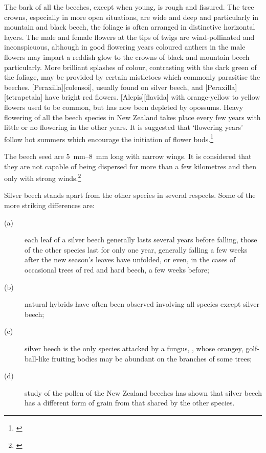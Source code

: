 The bark of all the beeches, except when young, is rough and fissured.
The tree crowns, especially in more open situations, are wide and deep and particularly in mountain and black beech, the foliage is often arranged in distinctive horizontal layers.
The male and female flowers at the tips of twigs are wind-pollinated and inconspicuous, although in good flowering years coloured anthers in the male flowers may impart a reddish glow to the crowns of black and mountain beech particularly.
More brilliant splashes of colour, contrasting with the dark green of the foliage, may be provided by certain mistletoes which commonly parasitise the beeches. [Peraxilla][colensoi], usually found on silver beech, and [Peraxilla][tetrapetala] have bright red flowers. [Alepis][flavida] with orange-yellow to yellow flowers used to be common, but has now been depleted by opossums.
Heavy flowering of all the beech species in New Zealand takes place every few years with little or no flowering in the other years.
It is suggested that `flowering years' follow hot summers which encourage the initiation of flower buds.\footnote{\cite{poole1948flowering}}

The beech seed are \SIrange{5}{8}{\milli\metre} long with narrow wings.
It is considered that they are not capable of being dispersed for more than a few kilometres and then only with strong winds.\footnote{\cite{preest1963dispersal}}

Silver beech stands apart from the other species in several respects.
Some of the more striking differences are:

\begin{description}
\item[{(a)}]each leaf of a silver beech generally lasts several years before falling, those of the other species last for only one year, generally falling a few weeks after the new season's leaves have unfolded, or even, in the cases of occasional trees of red and hard beech, a few weeks before;
\item[{(b)}]natural hybrids have often been observed involving all species except silver beech;
\item[{(c)}]silver beech is the only species attacked by a fungus, , whose orangey, golf-ball-like fruiting bodies may be abundant on the branches of some trees;
\item[{(d)}]study of the pollen of the New Zealand beeches has shown that silver beech has a different form of grain from that shared by the other species.
\end{description}

